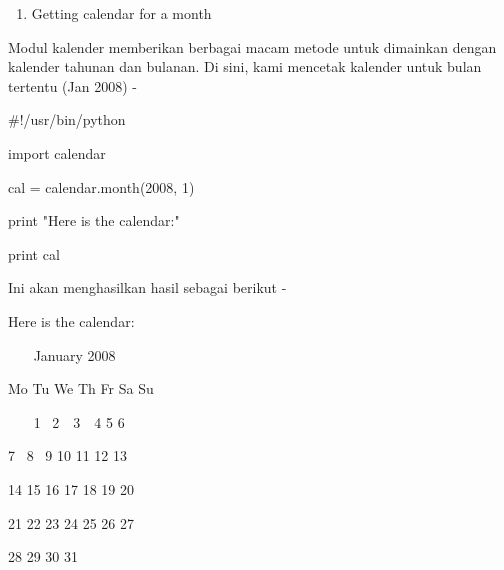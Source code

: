 \vspace{\baselineskip}
\noindent 
\begin{enumerate}
	\item Getting calendar for a month
\end{enumerate}
\noindent 
Modul kalender memberikan berbagai macam metode untuk dimainkan dengan kalender tahunan dan bulanan. Di sini, kami mencetak kalender untuk bulan tertentu (Jan 2008) - \par
\noindent 
 \hspace*{0.5in}  $  \#  $!/usr/bin/python \par
\noindent 
 \hspace*{0.5in} import calendar \par
\vspace{12pt}
\noindent 
 \hspace*{0.5in} cal = calendar.month(2008, 1) \par
\noindent 
 \hspace*{0.5in} print "Here is the calendar:" \par
\noindent 
 \hspace*{0.5in} print cal \par
\vspace{\baselineskip}
\noindent 
Ini akan menghasilkan hasil sebagai berikut - \par
\noindent 
 \hspace*{0.5in} Here is the calendar: \par
\noindent 
~~~  \hspace*{0.5in}  \hspace*{0.5in} January 2008 \par
\noindent 
 \hspace*{0.5in} Mo Tu We Th Fr Sa Su \par
\noindent 
~~~  \hspace*{0.5in}  \hspace*{0.5in} 1~ 2~~3~~4  5  6 \par
\noindent 
  \hspace*{0.5in}  \hspace*{0.5in} 7~ 8~ 9 10 11 12 13 \par
\noindent 
 \hspace*{0.5in}  \hspace*{0.5in} 14 15 16 17 18 19 20 \par
\noindent 
 \hspace*{0.5in}  \hspace*{0.5in} 21 22 23 24 25 26 27 \par
\noindent 
 \hspace*{0.5in}  \hspace*{0.5in} 28 29 30 31 \par
\noindent 

